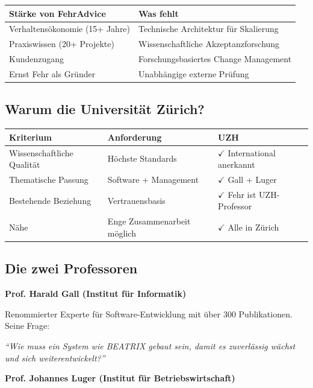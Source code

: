 \documentclass[11pt,a4paper]{article}
\begin{document}
\begin{table}[h]
\centering
\begin{tabular}{@{}L{6cm}L{7cm}@{}}
\toprule
\textbf{Stärke von FehrAdvice} & \textbf{Was fehlt} \\
\midrule
Verhaltensökonomie (15+ Jahre) & Technische Architektur für Skalierung \\
Praxiswissen (20+ Projekte) & Wissenschaftliche Akzeptanzforschung \\
Kundenzugang & Forschungsbasiertes Change Management \\
Ernst Fehr als Gründer & Unabhängige externe Prüfung \\
\bottomrule
\end{tabular}
\end{table}

\subsection{Warum die Universität Zürich?}

\begin{table}[h]
\centering
\begin{tabular}{@{}L{4cm}L{4cm}L{5cm}@{}}
\toprule
\textbf{Kriterium} & \textbf{Anforderung} & \textbf{UZH} \\
\midrule
Wissenschaftliche Qualität & Höchste Standards & $\checkmark$ International anerkannt \\
Thematische Passung & Software + Management & $\checkmark$ Gall + Luger \\
Bestehende Beziehung & Vertrauensbasis & $\checkmark$ Fehr ist UZH-Professor \\
Nähe & Enge Zusammenarbeit möglich & $\checkmark$ Alle in Zürich \\
\bottomrule
\end{tabular}
\end{table}

\subsection{Die zwei Professoren}

\textbf{Prof. Harald Gall (Institut für Informatik)}

Renommierter Experte für Software-Entwicklung mit über 300 Publikationen. Seine Frage:

\textit{``Wie muss ein System wie BEATRIX gebaut sein, damit es zuverlässig wächst und sich weiterentwickelt?''}

\textbf{Prof. Johannes Luger (Institut für Betriebswirtschaft)}
\end{document}
